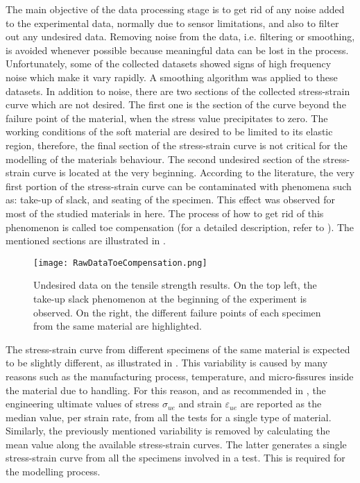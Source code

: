 The main objective of the data processing stage is to get rid of any noise added to the experimental data, normally due to sensor limitations, and also to filter out any undesired data. Removing noise from the data, i.e. filtering or smoothing, is avoided whenever possible because meaningful data can be lost in the process. Unfortunately, some of the collected datasets showed signs of high frequency noise which make it vary rapidly. A smoothing algorithm was applied to these datasets. In addition to noise, there are two sections of the collected stress-strain curve which are not desired. The first one is the section of the curve beyond the failure point of the material, when the stress value precipitates to zero. The working conditions of the soft material are desired to be limited to its elastic region, therefore, the final section of the stress-strain curve is not critical for the modelling of the materials behaviour. The second undesired section of the stress-strain curve is located at the very beginning. According to the literature, the very first portion of the stress-strain curve can be contaminated with phenomena such as: take-up of slack, and seating of the specimen. This effect was observed for most of the studied materials in here. The process of how to get rid of this phenomenon is called toe compensation (for a detailed description, refer to \cite{astmd638}). The mentioned sections are illustrated in .

\begin{figure}[htb!]
    \centering
    \texttt{[image: RawDataToeCompensation.png]}
    \caption{Undesired data on the tensile strength results. On the top left, the take-up slack phenomenon at the beginning of the experiment is observed. On the right, the different failure points of each specimen from the same material are highlighted.}
    \label{fig:rawData}
\end{figure}

The stress-strain curve from different specimens of the same material is expected to be slightly different, as illustrated in . This variability is caused by many reasons such as the manufacturing process, temperature, and micro-fissures inside the material due to handling. For this reason, and as recommended in \cite{astmd638,astmd412}, the engineering ultimate values of stress $\sigma_{ue}$ and strain $\varepsilon_{ue}$ are reported as the median value, per strain rate, from all the tests for a single type of material. Similarly, the previously mentioned variability is removed by calculating the mean value along the available stress-strain curves. The latter generates a single stress-strain curve from all the specimens involved in a test. This is required for the modelling process. 

